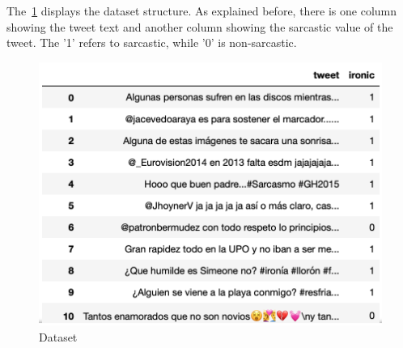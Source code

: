 The~\cref{fig:dataset} displays the dataset structure. As explained before, there is one column showing the tweet text and another column showing the sarcastic value of the tweet. The '1' refers to sarcastic, while '0' is non-sarcastic.
\begin{figure}
	\includegraphics[width=\linewidth]{img/dataset.png}
	\caption{Dataset}
	\label{fig:dataset}
\end{figure}

